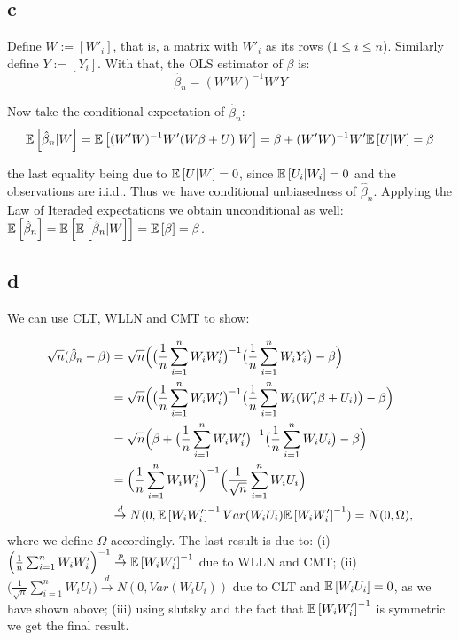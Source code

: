 \documentclass[12pt]{paper}
\begin{document}
\subsection*{c}

Define $W:=[W'_i]$, that is, a matrix with $W'_i$ as its rows ($1\le i\le n$). Similarly define $Y:=[Y_i]$. With that, the OLS estimator of $\beta$ is:
 \begin{equation}
\hat{\beta}_n=(W'W)^{-1}W'Y
\end{equation}

Now take the conditional expectation of $\hat{\beta}_n$:
\begin{equation}
\mathbb{E} \left [ \hat{\beta}_n|W \right ]=\mathbb{E} \left [ (W'W)^{-1}W'(W\beta+U)|W \right ]=\beta+(W'W)^{-1}W'\mathbb{E} \left [ U|W \right ]=\beta
\end{equation}

\noindent the last equality being due to $\mathbb{E} \left [ U|W \right ]=0$, since $\mathbb{E} \left [ U_i|W_i \right ]=0$ and the observations are i.i.d.. Thus we have conditional unbiasedness of $\hat{\beta}_n$. Applying the Law of Iteraded expectations we obtain unconditional as well: $\mathbb{E} \left [ \hat{\beta}_n \right ]=\mathbb{E} \left [ \mathbb{E} \left [ \hat{\beta}_n|W \right ] \right ]=\mathbb{E} \left [ \beta \right ]=\beta$.

\subsection*{d}

We can use CLT, WLLN and CMT to show:

\begin{equation}
\begin{split}
\sqrt{n}(\hat{\beta}_n-\beta)&=\sqrt{n}\Big(\big(\frac{1}{n}\sum_{i=1}^{n}{W_iW'_i}\big)^{-1}\big(\frac{1}{n}\sum_{i=1}^{n}{W_iY_i}\big)-\beta\Big)\\
&=\sqrt{n}\Big(\big(\frac{1}{n}\sum_{i=1}^{n}{W_iW'_i}\big)^{-1}\big(\frac{1}{n}\sum_{i=1}^{n}{W_i(W'_i\beta+U_i)}\big)-\beta\Big)\\
&=\sqrt{n}\Big(\beta+\big(\frac{1}{n}\sum_{i=1}^{n}{W_iW'_i}\big)^{-1}\big(\frac{1}{n}\sum_{i=1}^{n}{W_iU_i}\big)-\beta\Big)\\
&=\Big(\frac{1}{n}\sum_{i=1}^{n}{W_iW'_i}\Big)^{-1}\Big(\frac{1}{\sqrt{n}}\sum_{i=1}^{n}{W_iU_i}\Big)\\
&\overset{d}{\to}N(0,\mathbb{E} \left [ W_iW'_i \right ]^{-1}Var(W_iU_i)\mathbb{E} \left [ W_iW'_i \right ]^{-1})=N(0,\Omega),
\end{split}
\end{equation}
\noindent where we define $\Omega$ accordingly. The last result is due to: (i) $\Big(\frac{1}{n}\sum_{i=1}^{n}{W_iW'_i}\Big)^{-1}\overset{p}{\to}\mathbb{E} \left [ W_iW'_i \right ]^{-1}$ due to WLLN and CMT; (ii) $\Big(\frac{1}{\sqrt{n}}\sum_{i=1}^{n}{W_iU_i}\Big)\overset{d}{\to}N(0,Var(W_iU_i))$ due to CLT and $\mathbb{E} \left [ W_iU_i \right ]=0$, as we have shown above; (iii) using slutsky and the fact that $\mathbb{E} \left [ W_iW'_i \right ]^{-1}$ is symmetric we get the final result.
\end{document}
